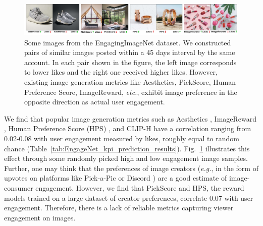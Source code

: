  \begin{figure}[!t]
   \centering
   \includegraphics[width=\textwidth]{images/metric_non_alignment_compressed.pdf}
   \caption{Some images from the EngagingImageNet dataset. We constructed pairs of similar images posted within a 45 days interval by the same account. In each pair shown in the figure, the left image corresponds to lower likes and the right one received higher likes. However, existing image generation metrics like Aesthetics, PickScore, Human Preference Score, ImageReward, \textit{etc.}, exhibit image preference in the opposite direction as actual user engagement. 
   \label{fig:metric_non_alignment_with_engagement}}
 \end{figure}

 
 We find that popular image generation metrics such as Aesthetics \cite{schuhmann2022laion}, ImageReward \cite{xu2024imagereward}, Human Preference Score (HPS) \cite{Wu_2023_ICCV}, and CLIP-H \cite{radford2021learning} have a correlation ranging from 0.02-0.08 with user engagement measured by likes, roughly equal to random chance (Table~\ref{tab:EngageNet_kpi_prediction_results}). Fig.~\ref{fig:metric_non_alignment_with_engagement} illustrates this effect through some randomly picked high and low engagement image samples. Further, one may think that the preferences of image creators (\textit{e.g.}, in the form of upvotes on platforms like Pick-a-Pic \cite{kirstain2023pick} or Discord \cite{Wu_2023_ICCV}) are a good estimate of image-consumer engagement. However, we find that PickScore and HPS, the reward models trained on a large dataset of creator preferences, correlate 0.07 with user engagement. Therefore, there is a lack of reliable metrics capturing viewer engagement on images. 


